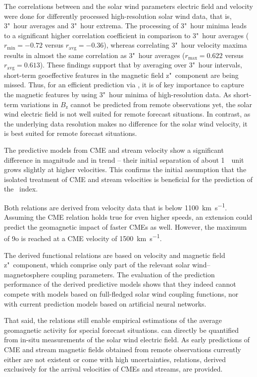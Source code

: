 The correlations between \Kp{} and the solar wind parameters electric field and velocity were done for differently processed high-resolution solar wind data, that is, 3"~hour averages and 3"~hour extrema. The processing of 3"~hour \vBz{} minima leads to a significant higher correlation coefficient in comparison to 3"~hour averages ($r_\text{min} = -0.72$ versus $r_\text{avg} = -0.36$), whereas correlating 3"~hour velocity maxima results in almost the same correlation as 3"~hour averages ($r_\text{max} = 0.622$ versus $r_\text{avg} = 0.613$).
These findings support that by averaging over 3"~hour intervals, short-term geoeffective features in the magnetic field z"~component are being missed. Thus, for an efficient \Kp{} prediction via \vBz{}, it is of key importance to capture the magnetic features by using 3"~hour minima of high-resolution data. As short-term variations in $B_\text{z}$ cannot be predicted from remote observations yet, the solar wind electric field is not well suited for remote forecast situations.
In contrast, as the underlying data resolution makes no difference for the solar wind velocity, it is best suited for remote forecast situations.

The \Kp{} predictive models from CME and stream velocity show a significant difference in magnitude and in trend -- their initial separation of about 1~\Kp~unit grows slightly at higher velocities. This confirms the initial assumption that the isolated treatment of CME and stream velocities is beneficial for the prediction of the \Kp~index.

Both relations are derived from velocity data that is below \SI{1100}{\km\per\s}. Assuming the CME relation holds true for even higher speeds, an extension could predict the geomagnetic impact of faster CMEs as well. However, the maximum \Kp{} of 9o is reached at a CME velocity of \SI{1500}{\km\per\s}.

The derived functional relations are based on velocity and magnetic field z"~component, which comprise only part of the relevant solar wind--magnetosphere coupling parameters. The evaluation of the prediction performance of the derived predictive models shows that they indeed cannot compete with models based on full-fledged solar wind coupling functions, nor with current prediction models based on artificial neural networks.

That said, the relations still enable empirical estimations of the average geomagnetic activity for special forecast situations. \Kp{} can directly be quantified from in-situ measurements of the solar wind electric field. As early predictions of CME and stream magnetic fields obtained from remote observations currently either are not existent or come with high uncertainties, \Kp{} relations, derived exclusively for the arrival velocities of CMEs and streams, are provided.


